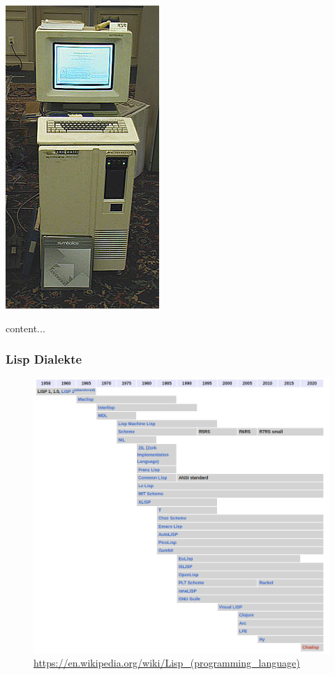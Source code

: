 \documentclass{beamer}
\begin{document}
\begin{frame}
\begin{itemize}
            \includegraphics[scale=0.1]{bilder/symblics.jpeg}
	\end{itemize}

\end{frame}

\begin{frame}
	content...
\end{frame}

\begin{frame}
\frametitle{Lisp Dialekte}
	\begin{figure}
	    \centering
	    \includegraphics[width=0.7\linewidth]{bilder/lisphis.png}
            \textmd{ \tiny \url{https://en.wikipedia.org/wiki/Lisp_(programming_language)}}
	\end{figure}
\end{frame}
\end{document}
